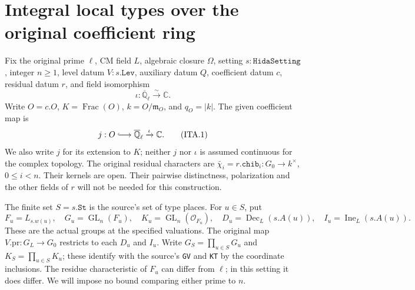 \section{Integral local types over the original coefficient ring}
\label{sec:integral-type-v43}


Fix the original prime $\ell$, CM field $L$, algebraic closure
$\Omega$, setting $s:\texttt{HidaSetting}$, integer $n\geq1$,
level datum $V:s.\texttt{Lev}$, auxiliary datum $Q$, coefficient
datum $c$, residual datum $r$, and field isomorphism
\[
 \iota:\overline{\mathbb Q}_\ell\xrightarrow{\sim}\mathbb C.
\]
Write $O=c.O$, $K=\operatorname{Frac}(O)$,
$k=O/\mathfrak m_O$, and $q_O=|k|$.  The given coefficient
map is
\[
 j:O\lhook\joinrel\longrightarrow\overline{\mathbb Q}_\ell
              \xrightarrow{\iota}\mathbb C.
 \tag{ITA.1}
\]
We also write $j$ for its extension to $K$; neither $j$ nor
$\iota$ is assumed continuous for the complex topology.
The original residual characters are
$\bar\chi_i=r.\texttt{chib}_i:G_0\to k^\times$,
$0\leq i<n$.  Their kernels are open.  Their pairwise
distinctness, polarization and the other fields of $r$ will not
be needed for this construction.

The finite set $S=s.\texttt{St}$ is the source's set of type
places.  For $u\in S$, put
\[
 F_u=L_{s.w(u)},\quad G_u=\operatorname{GL}_n(F_u),\quad
 K_u=\operatorname{GL}_n(\mathcal O_{F_u}),\quad
 D_u=\operatorname{Dec}_L(s.A(u)),\quad
 I_u=\operatorname{Ine}_L(s.A(u)).
 \tag{ITA.2}
\]
These are the actual groups at the specified valuations.
The original map $V.\mathrm{pr}:G_L\to G_0$ restricts to
each $D_u$ and $I_u$.  Write
$G_S=\prod_{u\in S}G_u$ and $K_S=\prod_{u\in S}K_u$;
these identify with the source's \texttt{GV} and \texttt{KT}
by the coordinate inclusions.  The residue characteristic of
$F_u$ can differ from $\ell$; in this setting it does differ.
We will impose no bound comparing either prime to $n$.

